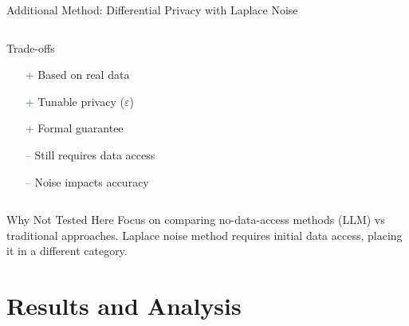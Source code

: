 \documentclass{beamer}
\begin{document}
\begin{frame}{Additional Method: Differential Privacy with Laplace Noise}
\begin{columns}[T]
\begin{column}{0.5\textwidth}
\begin{alertblock}{Trade-offs}
\begin{itemize}
    \item[\textcolor{green}{+}] Based on real data
    \item[\textcolor{green}{+}] Tunable privacy ($\varepsilon$)
    \item[\textcolor{green}{+}] Formal guarantee
    \item[\textcolor{red}{--}] Still requires data access
    \item[\textcolor{red}{--}] Noise impacts accuracy
\end{itemize}
\end{alertblock}
\end{column}
\end{columns}

\vspace{0.3cm}

\begin{block}{Why Not Tested Here}
Focus on comparing no-data-access methods (LLM) vs traditional approaches. Laplace noise method requires initial data access, placing it in a different category.
\end{block}

\end{frame}

\section{Results and Analysis}
\end{document}
